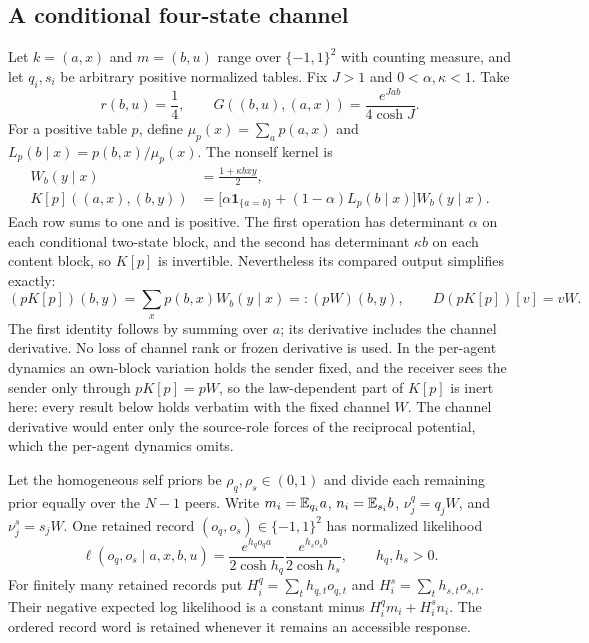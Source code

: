 \subsection{A conditional four-state channel}

Let $k=(a,x)$ and $m=(b,u)$ range over $\{-1,1\}^2$ with counting measure, and let $q_i,s_i$ be arbitrary positive normalized tables. Fix $J>1$ and $0<\alpha,\kappa<1$. Take
\begin{equation}
 r(b,u)=\frac14,\qquad
 G((b,u),(a,x))=\frac{e^{Jab}}{4\cosh J}.
 \label{pa:four-evaluator}
\end{equation}
For a positive table $p$, define $\mu_p(x)=\sum_a p(a,x)$ and $L_p(b\mid x)=p(b,x)/\mu_p(x)$. The nonself kernel is
\begin{equation}
 \begin{aligned}
 W_b(y\mid x)&=\frac{1+\kappa bxy}{2},\\
 K[p]((a,x),(b,y))
 &=\bigl[\alpha\mathbf1_{\{a=b\}}+(1-\alpha)L_p(b\mid x)\bigr]W_b(y\mid x).
 \end{aligned}
 \label{pa:four-channel}
\end{equation}
Each row sums to one and is positive. The first operation has determinant $\alpha$ on each conditional two-state block, and the second has determinant $\kappa b$ on each content block, so $K[p]$ is invertible. Nevertheless its compared output simplifies exactly:
\begin{equation}
 (pK[p])(b,y)=\sum_xp(b,x)W_b(y\mid x)=:(pW)(b,y),
 \qquad D(pK[p])[v]=vW.
 \label{pa:four-substitution}
\end{equation}
The first identity follows by summing over $a$; its derivative includes the channel derivative. No loss of channel rank or frozen derivative is used. In the per-agent dynamics an own-block variation holds the sender fixed, and the receiver sees the sender only through $pK[p]=pW$, so the law-dependent part of $K[p]$ is inert here: every result below holds verbatim with the fixed channel $W$. The channel derivative would enter only the source-role forces of the reciprocal potential, which the per-agent dynamics omits.

Let the homogeneous self priors be $\rho_q,\rho_s\in(0,1)$ and divide each remaining prior equally over the $N-1$ peers. Write $m_i=\mathbb E_{q_i}a$, $n_i=\mathbb E_{s_i}b$, $\nu_j^q=q_jW$, and $\nu_j^s=s_jW$. One retained record $(o_q,o_s)\in\{-1,1\}^2$ has normalized likelihood
\begin{equation}
 \ell(o_q,o_s\mid a,x,b,u)
 =\frac{e^{h_qo_qa}}{2\cosh h_q}
  \frac{e^{h_so_sb}}{2\cosh h_s},
 \qquad h_q,h_s>0.
 \label{pa:four-record}
\end{equation}
For finitely many retained records put $H_i^q=\sum_t h_{q,t}o_{q,t}$ and $H_i^s=\sum_t h_{s,t}o_{s,t}$. Their negative expected log likelihood is a constant minus $H_i^qm_i+H_i^sn_i$. The ordered record word is retained whenever it remains an accessible response.

